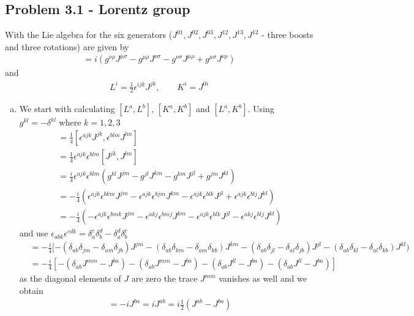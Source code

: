 \documentclass[../main.tex]{subfiles}
\begin{document}
\subsection{Problem 3.1 - Lorentz group}
With the Lie algebra for the six generators ($J^{01}, J^{02}, J^{03}, J^{12}, J^{13}, J^{12}$ - three boosts and three rotations) are  given by
\begin{align}
[J^{\mu\nu},J^{\rho\sigma}]=i(g^{\nu\rho}J^{\mu\sigma}-g^{\mu\rho}J^{\nu\sigma}-g^{\nu\sigma}J^{\mu\rho}+g^{\mu\sigma}J^{\nu\rho})
\end{align}
and
\begin{align}
L^i=\frac{1}{2}\epsilon^{ijk}J^{jk},\qquad K^i=J^{0i}
\end{align}
\begin{enumerate}[(a)]
\item We start with calculating $[L^a,L^b]$, $[K^a,K^b]$ and $[L^a,K^b]$.
Using $g^{kl}=-\delta^{kl}$ where $k=1,2,3$
\begin{align}
[L^a,L^b]&=\frac{1}{4}[\epsilon^{ajk}J^{jk},\epsilon^{blm}J^{lm}]\\
&=\frac{1}{4}\epsilon^{ajk}\epsilon^{blm}[J^{jk},J^{lm}]\\
&=\frac{i}{4}\epsilon^{ajk}\epsilon^{blm}(g^{kl}J^{jm}-g^{jl}J^{km}-g^{km}J^{jl}+g^{jm}J^{kl})\\
&=-\frac{i}{4}(\epsilon^{ajk}\epsilon^{bkm}J^{jm}-\epsilon^{ajk}\epsilon^{bjm}J^{km}-\epsilon^{ajk}\epsilon^{blk}J^{jl}+\epsilon^{ajk}\epsilon^{blj}J^{kl})\\
&=-\frac{i}{4}(-\epsilon^{ajk}\epsilon^{bmk}J^{jm}-\epsilon^{akj}\epsilon^{bmj}J^{km}-\epsilon^{ajk}\epsilon^{blk}J^{jl}-\epsilon^{akj}\epsilon^{blj}J^{kl})
\end{align}
and use $\epsilon_{abk}\epsilon^{cdk}=\delta^c_a\delta^d_b-\delta^d_a\delta^c_b$
\begin{align}
[L^a,L^b]
&=-\frac{i}{4}[
-(\delta_{ab}\delta_{jm}-\delta_{am}\delta_{jb})J^{jm}
-(\delta_{ab}\delta_{km}-\delta_{am}\delta_{kb})J^{km}
-(\delta_{ab}\delta_{jl}-\delta_{al}\delta_{jb})J^{jl}
-(\delta_{ab}\delta_{kl}-\delta_{al}\delta_{kb})J^{kl})\\
&=-\frac{i}{4}\left[
-(\delta_{ab}J^{mm}-J^{ba})
-(\delta_{ab}J^{mm}-J^{ba})
-(\delta_{ab}J^{ll}-J^{ba})
-(\delta_{ab}J^{ll}-J^{ba})\right]
\end{align}
as the diagonal elements of $J$ are zero the trace $J^{mm}$ vanishes as well and we obtain
\begin{align}
[L^a,L^b]
&=-iJ^{ba}=iJ^{ab}=i\frac{1}{2}(J^{ab}-J^{ba})\\

\end{align}
\end{enumerate}
\end{document}
